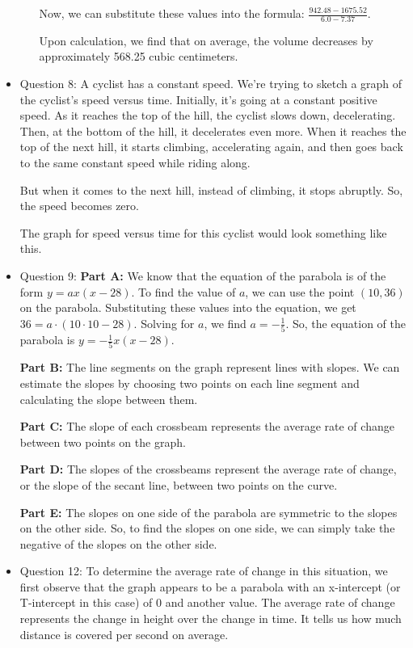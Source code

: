 \documentclass{article}
\begin{document}
\begin{itemize}
\begin{enumerate}
Now, we can substitute these values into the formula: \(\frac{942.48 - 1675.52}{6.0 - 7.37}\). 

Upon calculation, we find that on average, the volume decreases by approximately 568.25 cubic centimeters.
 
\end{enumerate}
\item Question 8:
A cyclist has a constant speed. We're trying to sketch a graph of the cyclist's speed versus time. Initially, it's going at a constant positive speed. As it reaches the top of the hill, the cyclist slows down, decelerating. Then, at the bottom of the hill, it decelerates even more. When it reaches the top of the next hill, it starts climbing, accelerating again, and then goes back to the same constant speed while riding along. 

But when it comes to the next hill, instead of climbing, it stops abruptly. So, the speed becomes zero. 

The graph for speed versus time for this cyclist would look something like this.

\item Question 9:
\textbf{Part A:} We know that the equation of the parabola is of the form \(y = ax(x - 28)\). To find the value of \(a\), we can use the point \((10, 36)\) on the parabola. Substituting these values into the equation, we get \(36 = a \cdot (10 \cdot 10 - 28)\). Solving for \(a\), we find \(a = -\frac{1}{5}\). So, the equation of the parabola is \(y = -\frac{1}{5}x(x - 28)\).

\textbf{Part B:} The line segments on the graph represent lines with slopes. We can estimate the slopes by choosing two points on each line segment and calculating the slope between them.

\textbf{Part C:} The slope of each crossbeam represents the average rate of change between two points on the graph.

\textbf{Part D:} The slopes of the crossbeams represent the average rate of change, or the slope of the secant line, between two points on the curve.

\textbf{Part E:} The slopes on one side of the parabola are symmetric to the slopes on the other side. So, to find the slopes on one side, we can simply take the negative of the slopes on the other side.

\item Question 12:
To determine the average rate of change in this situation, we first observe that the graph appears to be a parabola with an x-intercept (or T-intercept in this case) of 0 and another value. The average rate of change represents the change in height over the change in time. It tells us how much distance is covered per second on average.


\end{itemize}
\end{document}

